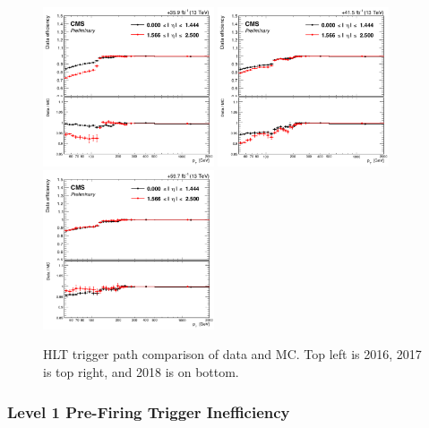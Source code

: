\begin{figure}[htbp]
  \centering
  \includegraphics[width=0.45\textwidth]{figures/2016/2016_electron_HLT_SF.png}
  \vspace{0.01\textwidth}
  \includegraphics[width=0.45\textwidth]{figures/2017/2017_electron_HLT_SF.png}
  \vspace{0.01\textwidth}
  \includegraphics[width=0.45\textwidth]{figures/2018/2018_electron_HLT_SF.png}
  \caption[HLT Trigger Path Data-MC Comparison]{HLT trigger path comparison of data and MC.  Top left is 2016, 2017 is top right, and 2018 is on bottom.}
 
  \label{fig:electronHLTSF}
\end{figure}

\subsubsection{Level 1 Pre-Firing Trigger Inefficiency}

